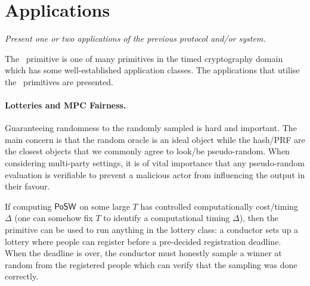 
\section{Applications}\label{sec:applications}

\begin{center}
	\itshape Present one or two applications of the previous protocol and/or system.
\end{center}

The \PoSW\ primitive is one of many primitives in the
timed cryptography domain which has some well-established application classes.
The applications that utilise the \PoSW\ primitives are presented.

\vspace{2mm}



\paragraph{Lotteries and MPC Fairness.}
Guaranteeing randomness to the randomly sampled is hard and important.
The main concern is that the random oracle is an ideal object while the hash/PRF are the closest
objects that we commonly agree to look/be pseudo-random.
When considering multi-party settings, it is of vital importance that any pseudo-random evaluation
is verifiable to prevent a malicious actor from influencing the output in their favour.

If computing $\textsf{PoSW}$ on some large $T$ has controlled computationally cost/timing $\Delta$
(one can somehow fix $T$ to identify a computational timing $\Delta$), then the primitive can be
used to run anything in the lottery class:
a conductor sets up a lottery where people can register before a pre-decided registration deadline.
When the deadline is over, the conductor must honestly sample a winner at random from the
registered people which can verify that the sampling was done correctly.


